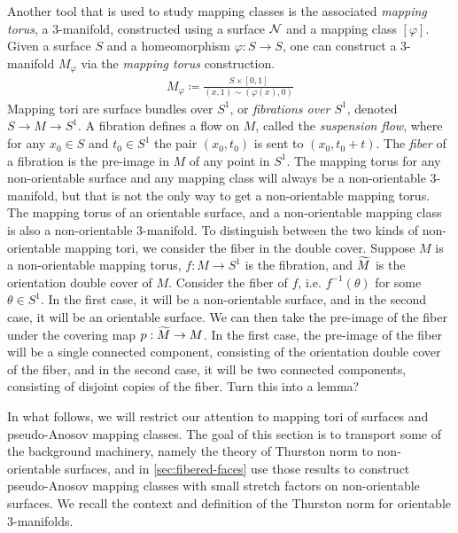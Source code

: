 Another tool that is used to study mapping classes is the associated \emph{mapping torus}, a $3$-manifold, constructed using a surface $\mathcal{N}$ and a mapping class $[\varphi]$.
Given a surface $S$ and a
homeomorphism $\varphi: S \to S$, one can construct a $3$-manifold $M_\varphi$ via the
\emph{mapping torus} construction.
\begin{align*}
  M_\varphi \coloneqq \frac{S \times [0,1]}{(x,1) \sim (\varphi(x), 0)}
\end{align*}
Mapping tori are surface bundles over $S^1$, or \emph{fibrations over $S^1$}, denoted
$S\rightarrow M\rightarrow S^1$. A fibration defines a {flow} on $M$, called the
\emph{suspension flow}, where for any $x_0\in S$ and $t_0\in S^1$ the pair $(x_0,t_0)$ is sent
to $(x_0,t_0+t)$.  The \emph{fiber} of a fibration is the pre-image in $M$ of any point in
$S^1$. The mapping torus for any non-orientable surface and any mapping class will always be a
non-orientable $3$-manifold, but that is not the only way to get a non-orientable mapping
torus. The mapping torus of an orientable surface, and a non-orientable mapping class is also
a non-orientable $3$-manifold. To distinguish between the two kinds of non-orientable mapping
tori, we consider the fiber in the double cover. Suppose $M$ is a non-orientable mapping
torus, $f: M \to S^1$ is the fibration, and $\widetilde{M}$ is the orientation double cover of $M$.
Consider the fiber of $f$, i.e. $f^{-1}(\theta)$ for some $\theta \in S^1$. In the first case,
it will be a non-orientable surface, and in the second case, it will be an orientable surface.
We can then take the pre-image of the fiber under the covering map $p: \widetilde{M} \to M$. In the
first case, the pre-image of the fiber will be a single connected component, consisting of the
orientation double cover of the fiber, and in the second case, it will be two connected components, consisting of disjoint copies of the fiber. {\color{red} Turn this into a lemma?}

In what follows, we will restrict our attention to mapping tori of surfaces and pseudo-Anosov
mapping classes. The goal of this section is to transport some of the background machinery, namely the theory of Thurston norm to non-orientable surfaces, and in \autoref{sec:fibered-faces} use those results to construct pseudo-Anosov mapping classes with
small stretch factors on non-orientable surfaces. We recall the context and definition of the
Thurston norm for orientable $3$-manifolds.

